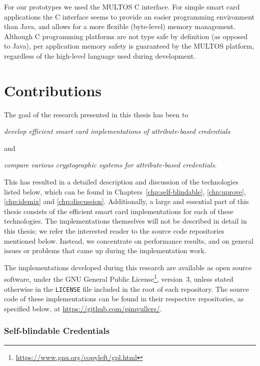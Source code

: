 For our prototypes we used the MULTOS C interface. For simple smart card
applications the C interface seems to provide an easier programming environment
than Java, and allows for a more flexible (byte-level) memory management.
Although C programming platforms are not type safe by definition (as opposed to
Java), per application memory safety is guaranteed by the MULTOS platform,
regardless of the high-level language used during development.


\section{Contributions}

The goal of the research presented in this thesis has been to
\begin{center}\it
  develop efficient smart card implementations of attribute-based credentials
\end{center}
and
\begin{center}\it
  compare various cryptographic systems for attribute-based credentials.
\end{center}
This has resulted in a detailed description and discussion of the technologies
listed below, which can be found in Chapters~\ref{chp:self-blindable},
\ref{chp:uprove}, \ref{chp:idemix} and \ref{chp:discussion}. Additionally, a
large and essential part of this thesis consists of the efficient smart card
implementations for each of these technologies. The implementations themselves
will not be described in detail in this thesis; we refer the interested reader
to the source code repositories mentioned below. Instead, we concentrate on
performance results, and on general issues or problems that came up during the
implementation work.

The implementations developed during this research are available as open source
software, under the GNU General Public
License\footnote{\url{https://www.gnu.org/copyleft/gpl.html}}, version~3,
unless stated otherwise in the \texttt{LICENSE} file included in the root of
each repository. The source code of these implementations can be found in their
respective repositories, as specified below, at \url{https://github.com/pimvullers/}.

\subsubsection{Self-blindable Credentials}

